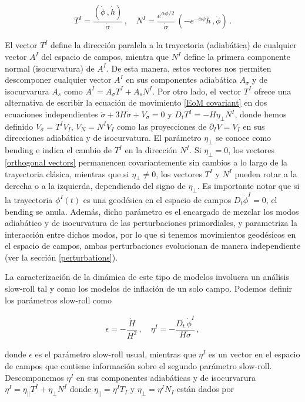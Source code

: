 \documentclass[12pt,a4paper,english,nofootinbib]{revtex4}
\newcommand{\beq}{\begin{eqnarray}}
\newcommand{\enq}{\end{eqnarray}}
\begin{document}
\beq 
    T^I = \dfrac{(\dot{\phi}\,,\dot{h})}{\dot{\sigma}}\,,\quad N^I = \dfrac{e^{\alpha\phi/2}}{\dot{\sigma}}\,( -e^{-\alpha\phi}\dot{h}\,,\dot{\phi})\,.
    \label{orthogonal vectors}
\enq 


El vector $T^I$ define la dirección paralela a la trayectoria (adiabática) de cualquier vector $A^I$ del espacio de campos, mientra que $N^I$ define la primera componente normal (isocurvatura) de $A^I$. De esta manera, estos vectores nos permiten descomponer cualquier vector $A^I$ en sus componentes adiabática $A_\sigma$ y de isocurvarura $A_s$ como $A^I = A_\sigma T^I + A_s N^I$. Por otro lado, el vector $T^I$ ofrece una alternativa de escribir la ecuación de movimiento \eqref{EoM covariant} en dos ecuaciones independientes  $\ddot{\sigma} + 3H\dot{\sigma} + V_\sigma = 0$ y $D_t T^I = - H\eta_\perp N^I$, donde hemos definido $V_\sigma = T^I V_I$, $V_N = N^I V_I$ como las proyecciones de $\partial_I V = V_I$ en sus direcciones adiabática y de isocurvatura. El parámetro $\eta_\perp$ se conoce como bending e indica el cambio de $T^I$ en la dirección $N^I$.  
Si $\eta_\perp = 0$, los vectores \eqref{orthogonal vectors} permanencen covariantemente sin cambios a lo largo de la trayectoria clásica, mientras que si $\eta_\perp \neq 0$, los vectores $T^I$ y $N^I$ pueden rotar a la derecha o a la izquierda, dependiendo del signo de $\eta_\perp$. Es importante notar que si la trayectoria $\phi^I(t)$ es una geodésica en el espacio de campos $D_t \dot{\phi}^I = 0$, el bending se anula. Además, dicho parámetro es el encargado de mezclar los modos adiabático y de isocurvatura de las perturbaciones primordiales, y parametriza la interacción entre dichos modos, por lo que si tenemos movimientos geodésicos en el espacio de campos, ambas perturbaciones evolucionan de manera independiente (ver la sección \ref{perturbations}).

La caracterización de la dinámica de este tipo de modelos involucra un análisis slow-roll tal y como los modelos de inflación de un solo campo. Podemos definir los parámetros slow-roll como 

\beq 
    \epsilon = -\dfrac{\dot{H}}{H^2}\,,\quad \eta^I = - \dfrac{D_t\,\dot{\phi}^I}{H\dot{\sigma}}\,,
    \label{SR parameters}
\enq


donde $\epsilon$ es el parámetro slow-roll usual, mientras que $\eta^I$ es un vector en el espacio de campos que contiene información sobre el segundo parámetro slow-roll. Descomponemos $\eta^I$ en sus componentes adiabáticas y de isocurvarura $\eta^I = \eta_{||} T^I + \eta_\perp N^I$ donde $\eta_{||} = \eta^I T_I$ y $\eta_\perp = \eta^I N_I$ están dados por 
\end{document}
